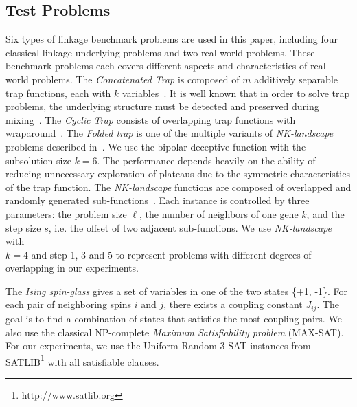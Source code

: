 \subsection{Test Problems}
Six types of linkage benchmark problems are used in this paper, including four classical linkage-underlying problems and two real-world problems. These benchmark problems each covers different aspects and characteristics of real-world problems. The \textit{Concatenated Trap} is composed of $m$ additively separable trap functions, each with $k$ variables~\cite{deb:sufficient}. It is well known that in order to solve trap problems, the underlying structure must be detected and preserved during mixing~\cite{thierens:mixing}. The \textit{Cyclic Trap} consists of overlapping trap functions with wraparound~\cite{yu:overlapping}. The \textit{Folded trap} is one of the multiple variants of \textit{NK-landscape} problems described in~\cite{goldberg:deception}. We use the bipolar deceptive function with the subsolution size $k = 6$. 
The performance depends heavily on the ability of reducing unnecessary exploration of plateaus due to the symmetric characteristics of the trap function. 
The \textit{NK-landscape} functions are composed of overlapped and randomly generated sub-functions~\cite{pelikan:overlap}. 
Each instance is controlled by three parameters: the problem size $\ell$, the number of neighbors of one gene $k$, and the step size $s$, i.e. the offset of two adjacent sub-functions.
We use \textit{NK-landscape} with \\$k = 4$ and step 1, 3 and 5 to represent problems with different degrees of overlapping in our experiments.

The \textit{Ising spin-glass} gives a set of variables in one of the two states \{+1, -1\}.
For each pair of neighboring spins $i$ and $j$, there exists a coupling constant $J_{ij}$.
The goal is to find a combination of states that satisfies the most coupling pairs.
We also use the classical NP-complete \textit{Maximum Satisfiability problem} (MAX-SAT).
For our experiments, we use the Uniform Random-3-SAT instances from SATLIB\footnote{http://www.satlib.org} with all satisfiable clauses.



